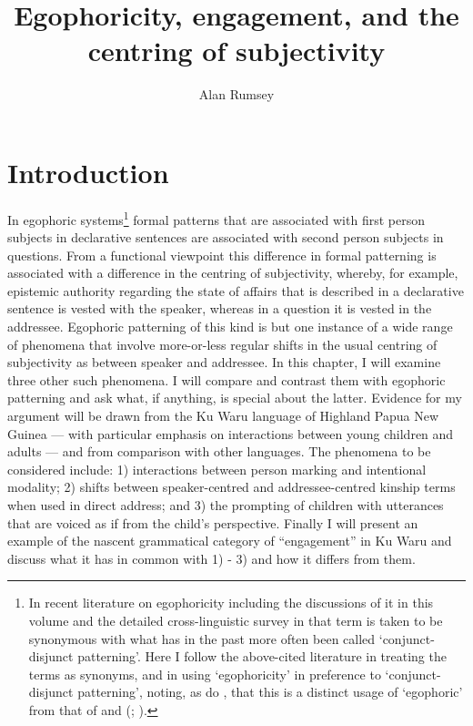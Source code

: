 \documentclass[output=paper]{langsci/langscibook}
\author{Alan Rumsey \affiliation{Australian National University}}
\title{Egophoricity, engagement, and the centring of subjectivity}
\begin{document}
\maketitle

\section{Introduction}\label{s:ar1} 

In egophoric systems\footnote{In recent literature on egophoricity including the discussions of it in this volume and the detailed cross-linguistic survey in \cite{SanRoqueSchieffelin2018} that term is taken to be synonymous with what has in the past more often been called ‘conjunct-disjunct patterning’. Here I follow the above-cited literature in treating the terms as synonyms, and in using ‘egophoricity’ in preference to ‘conjunct-disjunct patterning’, noting, as do \citeauthor{SanRoqueSchieffelin2018}, that this is a distinct usage of ‘egophoric’ from that of  \cite{Hagege1974} and \citeauthor{Dahl2001} (\citeyear{Dahl2001}; \citeyear{Dahl2008}).} formal patterns that are associated with first person subjects in declarative sentences are associated with second person subjects in questions.  From a functional viewpoint this difference in formal patterning is associated with a difference in the centring of subjectivity, whereby, for example, epistemic authority regarding the state of affairs that is described in a declarative sentence is vested with the speaker, whereas in a question it is vested in the addressee.
Egophoric patterning of this kind is but one instance of a wide range of phenomena that involve more-or-less regular shifts in the usual centring of subjectivity as between speaker and addressee. In this chapter, I will examine three other such phenomena. I will compare and contrast them with egophoric patterning and ask what, if anything, is special about the latter. Evidence for my argument will be drawn from the Ku Waru language of Highland Papua New Guinea —  with particular emphasis on interactions between young children and adults —  and from comparison with other languages. The phenomena to be considered include: 1) interactions between person marking and intentional modality; 2) shifts between speaker-centred and addressee-centred kinship terms when used in direct address; and 3) the prompting of children with utterances that are voiced as if from the child’s perspective. Finally I will present an example of the nascent grammatical category of “engagement” in Ku Waru and discuss what it has in common with 1) - 3) and how it differs from them.
\end{document}
